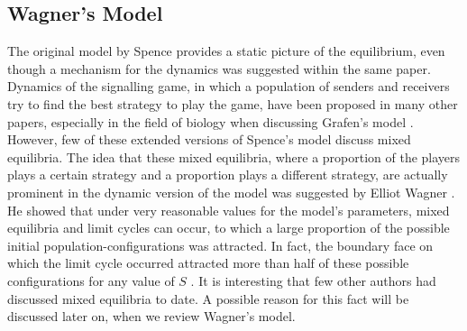 \documentclass[a4paper,10pt]{article}
\numberwithin{equation}{section}
\begin{document}
\subsection{Wagner's Model}
\label{sec:Wagner's Model}

The original model by Spence provides a static picture of the equilibrium, even though a mechanism for the dynamics was suggested within the same paper. Dynamics of the signalling game, in which a population of senders and receivers try to find the best strategy to play the game, have been proposed in many other papers, especially in the field of biology when discussing Grafen's model \cite{Cressman2003, Hofbauer1998, Hofbauer2003}. However, few of these extended versions of Spence's model discuss mixed equilibria. The idea that these mixed equilibria, where a proportion of the players plays a certain strategy and a proportion plays a different strategy, are actually prominent in the dynamic version of the model was suggested by Elliot Wagner \cite{Wagner2010}. He showed that under very reasonable values for the model's parameters, mixed equilibria and limit cycles can occur, to which a large proportion of the possible initial population-configurations was attracted. In fact, the boundary face on which the limit cycle occurred attracted more than half of these possible configurations for any value of $S$ \cite{Wagner2010}. It is interesting that few other authors had discussed mixed equilibria to date. A possible reason for this fact will be discussed later on, when we review Wagner's model.\\
\\
\end{document}
